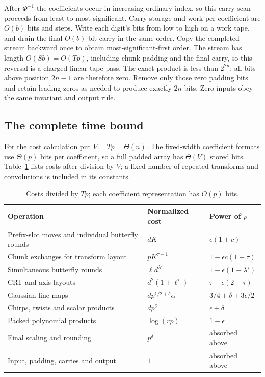 After $\Phi^{-1}$ the coefficients occur in increasing ordinary index,
so this carry scan proceeds from least to most significant.  Carry
storage and work per coefficient are $O(b)$ bits and steps.  Write
each digit's bits from low to high on a work tape, and drain the final
$O(b)$-bit carry in the same order.  Copy the completed stream backward
once to obtain most-significant-first order.  The stream has length
$O(Sb)=O(Tp)$, including chunk padding and the final carry, so this
reversal is a charged linear tape pass.  The exact product is less
than $2^{2n}$; all bits above position $2n-1$ are therefore zero.
Remove only those zero padding bits and retain leading zeros as needed
to produce exactly $2n$ bits.  Zero inputs obey the same invariant and
output rule.

\subsection{The complete time bound}

For the cost calculation put $V=Tp=\Theta(n)$. The fixed-width coefficient
formats use $\Theta(p)$ bits per coefficient, so a full padded array has
$\Theta(V)$ stored bits. Table~\ref{tab:costs} lists costs after division
by $V$; a fixed number of repeated transforms and convolutions is
included in its constants.
\begin{table}[ht]
\centering
\small
\begin{tabular}{@{}>{\raggedright\arraybackslash}p{.40\linewidth}ll@{}}
\toprule
Operation & Normalized cost & Power of $p$\\
\midrule
Prefix-slot moves and individual butterfly rounds & $dK$ & $\epsilon(1+c)$\\
Chunk exchanges for transform layout & $pK^{\tau-1}$ & $1-\epsilon c(1-\tau)$\\
Simultaneous butterfly rounds & $\ell d^{\lambda'}$ & $1-\epsilon(1-\lambda')$\\
CRT and axis layouts & $d^2(1+\ell^\tau)$ & $\tau+\epsilon(2-\tau)$\\
Gaussian line maps & $dp^{1/2+\delta}\alpha$ & $3/4+\delta+3\epsilon/2$\\
Chirps, twists and scalar products & $dp^\delta$ & $\epsilon+\delta$\\
Packed polynomial products & $\log(rp)$ & $1-\epsilon$\\
Final scaling and rounding & $p^\delta$ & absorbed above\\
Input, padding, carries and output & $1$ & absorbed above\\
\bottomrule
\end{tabular}
\caption{Costs divided by $Tp$; each coefficient
representation has $O(p)$ bits.}\label{tab:costs}
\end{table}

